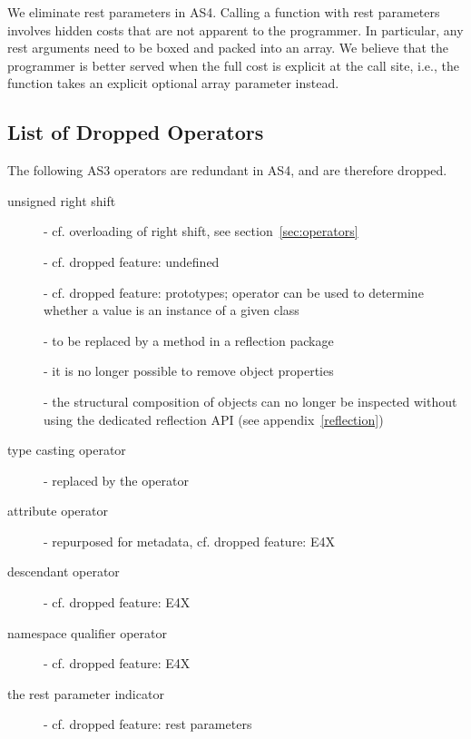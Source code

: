 We eliminate rest parameters in AS4. Calling a function with rest
parameters involves hidden costs that are not apparent to the
programmer. In particular, any rest arguments need to be boxed and packed into
an array. We believe that the programmer is better served when the full
cost is explicit at the call site, i.e., the function takes an explicit
optional array parameter instead.

\subsection{List of Dropped Operators}
\label{redundantOperators}
The following AS3 operators are redundant in AS4, and are therefore dropped.

\begin{description}
\item [unsigned right shift \code{>>>}] -
    cf. overloading of right shift, see section~\ref{sec:operators}

\item [] -
    cf. dropped feature: undefined

\item  [] -
    cf. dropped feature: prototypes; operator  can be used to determine
    whether a value is an instance of a given class

\item [] -
    to be replaced by a method in a reflection package

\item [] -
    it is no longer possible to remove object properties

\item [] -
    the structural composition of objects can no longer be inspected without using the dedicated reflection API (see
    appendix~\ref{reflection})

\item [type casting operator ] -
    replaced by the operator 

\item [attribute operator ] -
    repurposed for metadata, cf. dropped feature: E4X

\item [descendant operator ] -
    cf. dropped feature: E4X

\item [namespace qualifier operator \code{::}] -
    cf. dropped feature: E4X

\item [the rest parameter indicator ] -
    cf. dropped feature: rest parameters
\end{description}
